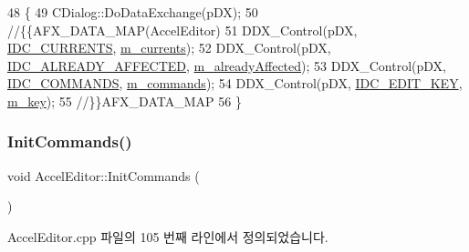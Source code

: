 \begin{DoxyCode}
48 \{
49   CDialog::DoDataExchange(pDX);
50   \textcolor{comment}{//\{\{AFX\_DATA\_MAP(AccelEditor)}
51   DDX\_Control(pDX, \mbox{\hyperlink{resource_8h_aecf06df6d523df832c4125d6511946ae}{IDC\_CURRENTS}}, \mbox{\hyperlink{class_accel_editor_a31909da8a929ef7b5e22ffbf64f1c68c}{m\_currents}});
52   DDX\_Control(pDX, \mbox{\hyperlink{resource_8h_ac348623d1b045f612bab36c7899d9507}{IDC\_ALREADY\_AFFECTED}}, \mbox{\hyperlink{class_accel_editor_ac3d2378be850611ee51689bd34475275}{m\_alreadyAffected}});
53   DDX\_Control(pDX, \mbox{\hyperlink{resource_8h_abc997c435dcb4d0b7fd9d34b51a905f1}{IDC\_COMMANDS}}, \mbox{\hyperlink{class_accel_editor_aba4ea3d3eced08de9fe39e307b5f40fc}{m\_commands}});
54   DDX\_Control(pDX, \mbox{\hyperlink{resource_8h_a5c53f670221b594a3fd960d7bc18325d}{IDC\_EDIT\_KEY}}, \mbox{\hyperlink{class_accel_editor_af0875f914fdddf5233a951cabd499a4d}{m\_key}});
55   \textcolor{comment}{//\}\}AFX\_DATA\_MAP}
56 \}
\end{DoxyCode}
\mbox{\label{class_accel_editor_a3c882fb85c72711e26cfe800fb11ccfa}} 
\subsubsection{\texorpdfstring{Init\+Commands()}{InitCommands()}}
{\footnotesize\ttfamily void Accel\+Editor\+::\+Init\+Commands (\begin{DoxyParamCaption}{ }\end{DoxyParamCaption})}



Accel\+Editor.\+cpp 파일의 105 번째 라인에서 정의되었습니다.


